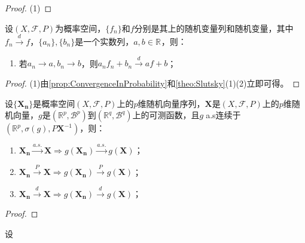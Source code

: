 \begin{proof}
	(1)
\end{proof}
\begin{property}\label{prop:ConvergenceInDistribution}
	设$(X,\mathscr{F},P)$为概率空间，$\{f_n\}$和$f$分别是其上的随机变量列和随机变量，其中$f_n\overset{d}{\longrightarrow}f$，$\{a_n\},\{b_n\}$是一个实数列，$a,b\in\mathbb{R}^{}$，则：
	\begin{enumerate}
		\item 若$a_n\to a,b_n\to b$，则$a_nf_n+b_n\overset{d}{\longrightarrow}af+b$；
	\end{enumerate}
\end{property}
\begin{proof}
	(1)由\cref{prop:ConvergenceInProbability}和\cref{theo:Slutsky}(1)(2)立即可得。
\end{proof}
\begin{theorem}\label{theo:ContinuousMappingTheorem}
	设$\{\mathbf{X_n}\}$是概率空间$(X,\mathscr{F},P)$上的$p$维随机向量序列，$\mathbf{X}$是$(X,\mathscr{F},P)$上的$p$维随机向量，$g$是$(\mathbb{R}^{p},\mathcal{B}^p)$到$(\mathbb{R}^{q},\mathcal{B}^q)$上的可测函数，且$g\;$a.s连续于$(\mathbb{R}^{p},\sigma(g),P\mathbf{X}^{-1})$，则：
	\begin{enumerate}
		\item $\mathbf{X_n}\overset{a.s.}{\longrightarrow}\mathbf{X}\Rightarrow g(\mathbf{X_n})\overset{a.s.}{\longrightarrow}g(\mathbf{X})$；
		\item $\mathbf{X_n}\overset{P}{\longrightarrow}\mathbf{X}\Rightarrow g(\mathbf{X_n})\overset{P}{\longrightarrow}g(\mathbf{X})$；
		\item $\mathbf{X_n}\overset{d}{\longrightarrow}\mathbf{X}\Rightarrow g(\mathbf{X_n})\overset{d}{\longrightarrow}g(\mathbf{X})$；
	\end{enumerate}
\end{theorem}
\begin{proof}
\end{proof}

\begin{definition}
	设
\end{definition}





